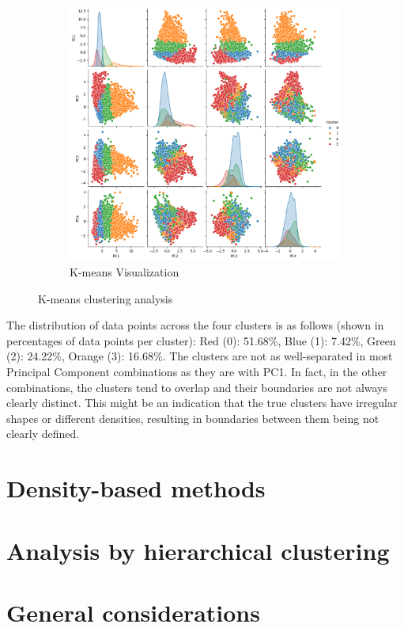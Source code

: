 \begin{figure}[h]
\begin{subfigure}[b]{0.3\textwidth}
        \centering
        \includegraphics[width=\textwidth]{plots/pairplot_kmeans.png}
        \caption{K-means Visualization}
        \label{fig:pairplot_kmeans}
    \end{subfigure}
    \caption{K-means clustering analysis}
    \label{fig:three_subplots}
\end{figure}
The distribution of data points across the four clusters is as follows (shown in percentages of data points per cluster):
Red (0): 51.68\%, Blue (1): 7.42\%, Green (2): 24.22\%, Orange (3): 16.68\%.
The clusters are not as well-separated in most Principal Component combinations as they are with PC1. 
In fact, in the other combinations, the clusters tend to overlap and their boundaries are not always clearly distinct.
This might be an indication that the true clusters have irregular shapes or different densities, resulting in boundaries between them being not clearly defined.



\section{Density-based methods}\label{sec:density_based}


\section{Analysis by hierarchical clustering}\label{sec:hierarchical}


\section{General considerations}\label{sec:considerations}